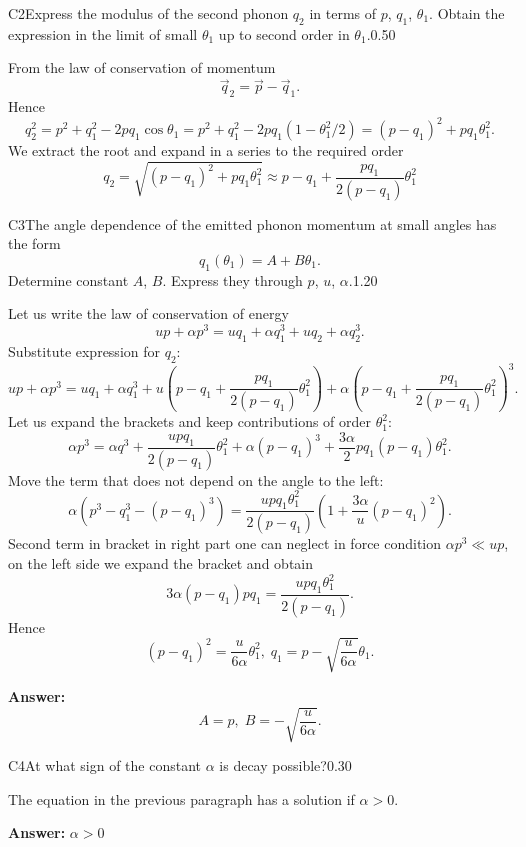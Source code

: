 \documentclass[11pt,a4paper]{article}
\begin{document}
\begin{solcard}{C2}{Express the modulus of the second phonon $q_2$ in terms of $p$, $q_1$, $\theta_1$. Obtain the expression in the limit of small $\theta_1$ up to second order in $\theta_1$.}{0.50}

From the law of conservation of momentum $$ \vec{q}_2 = \vec{p} - \vec{q}_1. $$Hence $$ q_2^2 = p^2 + q_1^2 - 2 p q_1 \cos \theta_1 = p^2 + q_1^2 - 2 p q_1 (1 - \theta_1^2/2) =  (p - q_1)^2+ p q_1 \theta_1^2. $$We extract the root and expand in a series to the required order $$ q_2 = \sqrt{  (p - q_1)^2+ p q_1 \theta_1^2} \approx p - q_1 + \frac{p q_1}{2(p - q_1)} \theta_1^2 $$

\end{solcard}

\begin{solcard}{C3}{The angle dependence of the emitted phonon momentum at small angles has the form $$q_1(\theta_1) = A + B \theta_1.$$ Determine constant $A$, $B$. Express they through $p$, $u$, $\alpha$.}{1.20}

Let us write the law of conservation of energy $$ u p + \alpha p^3 = u q_1 + \alpha q_1^3 + u q_2 + \alpha q_2^3. $$Substitute expression for $q_2$: $$ u p + \alpha p^3 = u q_1 + \alpha q_1^3 + u \left(p - q_1 +  \frac{p q_1}{2(p - q_1)} \theta_1^2\right) + \alpha \left( p - q_1 + \frac{p q_1}{2(p - q_1)} \theta_1^2\right)^3. $$Let us expand the brackets and keep contributions of order $\theta_1^2$: $$ \alpha p^3  = \alpha q^3 + \frac{u p q_1}{2 (p - q_1)} \theta_1^2 +\alpha (p - q_1)^3 + \frac{3 \alpha}{2} p q_1 (p - q_1)\theta_1^2. $$Move the term that does not depend on the angle to the left: $$ \alpha (p^3 - q_1^3 - (p-q_1)^3) = \frac{u p q_1 \theta_1^2}{2(p - q_1)} \left( 1 + \frac{3 \alpha}{u } (p - q_1)^2\right).$$Second term in bracket in right part one can neglect in force condition $\alpha p^3 \ll u p$, on the left side we expand the bracket and obtain $$ 3 \alpha (p - q_1) p q_1 = \frac{u p q_1 \theta_1^2}{2(p - q_1)}. $$Hence $$ (p-q_1 )^2 = \frac{u }{6 \alpha} \theta_1^2, \; q_1 = p - \sqrt{\frac{u}{6 \alpha}} \theta_1. $$

\par\smallskip\noindent\textbf{Answer:} $$ A = p, \; B = - \sqrt{\frac{u}{6 \alpha}}. $$
\end{solcard}

\begin{solcard}{C4}{At what sign of the constant $\alpha$ is decay possible?}{0.30}

The equation in the previous paragraph has a solution if $\alpha > 0$.

\par\smallskip\noindent\textbf{Answer:} $\alpha > 0$
\end{solcard}
\end{document}
